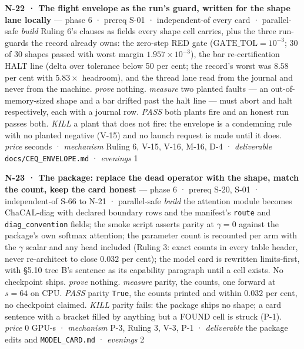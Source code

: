 \documentclass[11pt,a4paper]{article}
\theoremstyle{plain}
\theoremstyle{definition}
\theoremstyle{remark}
\begin{document}
\textbf{N-22 · The flight envelope as the run's guard, written for the
shape lane locally} --- phase 6 · prereq S-01 · independent-of every
card · parallel-safe \emph{build} Ruling 6's clauses as fields every
shape cell carries, plus the three run-guards the record already owns:
the zero-step RED gate (\(\mathrm{GATE\_TOL}=10^{-3}\); 30 of 30 shapes
passed with worst margin \(1.957\times10^{-3}\)), the bar
re-certification HALT line (delta over tolerance below 50 per cent; the
record's worst was \(8.58\) per cent with \(5.83\times\) headroom), and
the thread lane read from the journal and never from the machine.
\emph{prove} nothing. \emph{measure} two planted faults --- an
out-of-memory-sized shape and a bar drifted past the halt line --- must
abort and halt respectively, each with a journal row. \emph{PASS} both
plants fire and an honest run passes both. \emph{KILL} a plant that does
not fire: the envelope is a condemning rule with no planted negative
(V-15) and no launch request is made until it does. \emph{price} seconds
· \emph{mechanism} Ruling 6, V-15, V-16, M-16, D-4 · \emph{deliverable}
\texttt{docs/CEQ\_ENVELOPE.md} · \emph{evenings} 1

\textbf{N-23 · The package: replace the dead operator with the shape,
match the count, keep the card honest} --- phase 6 · prereq S-20, S-01 ·
independent-of S-66 to N-21 · parallel-safe \emph{build} the attention
module becomes ChaCAL-diag with declared boundary rows and the
manifest's \texttt{route} and \texttt{diag\_convention} fields; the
smoke script asserts parity at \(\gamma=0\) against the package's own
softmax attention; the parameter count is recounted per arm with the
\(\gamma\) scalar and any head included (Ruling 3: exact counts in every
table header, never re-architect to close \(0.032\) per cent); the model
card is rewritten limits-first, with §5.10 tree B's sentence as its
capability paragraph until a cell exists. No checkpoint ships.
\emph{prove} nothing. \emph{measure} parity, the counts, one forward at
\(s=64\) on CPU. \emph{PASS} parity \texttt{True}, the counts printed
and within \(0.032\) per cent, no checkpoint claimed. \emph{KILL} parity
fails: the package ships no shape; a card sentence with a bracket filled
by anything but a FOUND cell is struck (P-1). \emph{price} \(0\) GPU-s ·
\emph{mechanism} P-3, Ruling 3, V-3, P-1 · \emph{deliverable} the
package edits and \texttt{MODEL\_CARD.md} · \emph{evenings} 2
\end{document}
